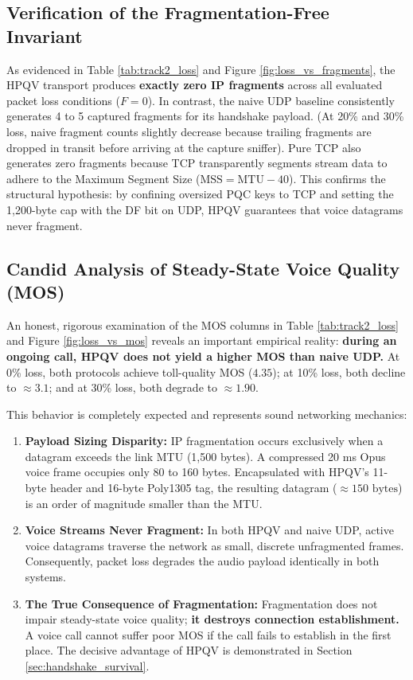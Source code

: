 \subsection{Verification of the Fragmentation-Free Invariant}
As evidenced in Table \ref{tab:track2_loss} and Figure \ref{fig:loss_vs_fragments}, the HPQV transport produces \textbf{exactly zero IP fragments} across all evaluated packet loss conditions ($F = 0$). In contrast, the naive UDP baseline consistently generates 4 to 5 captured fragments for its handshake payload. (At 20\% and 30\% loss, naive fragment counts slightly decrease because trailing fragments are dropped in transit before arriving at the capture sniffer). Pure TCP also generates zero fragments because TCP transparently segments stream data to adhere to the Maximum Segment Size ($\text{MSS} = \text{MTU} - 40$). This confirms the structural hypothesis: by confining oversized PQC keys to TCP and setting the 1,200-byte cap with the DF bit on UDP, HPQV guarantees that voice datagrams never fragment.

\subsection{Candid Analysis of Steady-State Voice Quality (MOS)}
An honest, rigorous examination of the MOS columns in Table \ref{tab:track2_loss} and Figure \ref{fig:loss_vs_mos} reveals an important empirical reality: \textbf{during an ongoing call, HPQV does not yield a higher MOS than naive UDP.} At 0\% loss, both protocols achieve toll-quality MOS ($4.35$); at 10\% loss, both decline to $\approx 3.1$; and at 30\% loss, both degrade to $\approx 1.90$.

This behavior is completely expected and represents sound networking mechanics:
\begin{enumerate}
    \item \textbf{Payload Sizing Disparity:} IP fragmentation occurs exclusively when a datagram exceeds the link MTU (1,500 bytes). A compressed 20 ms Opus voice frame occupies only 80 to 160 bytes. Encapsulated with HPQV's 11-byte header and 16-byte Poly1305 tag, the resulting datagram ($\approx 150\text{ bytes}$) is an order of magnitude smaller than the MTU.
    \item \textbf{Voice Streams Never Fragment:} In both HPQV and naive UDP, active voice datagrams traverse the network as small, discrete unfragmented frames. Consequently, packet loss degrades the audio payload identically in both systems.
    \item \textbf{The True Consequence of Fragmentation:} Fragmentation does not impair steady-state voice quality; \textbf{it destroys connection establishment.} A voice call cannot suffer poor MOS if the call fails to establish in the first place. The decisive advantage of HPQV is demonstrated in Section \ref{sec:handshake_survival}.
\end{enumerate}

